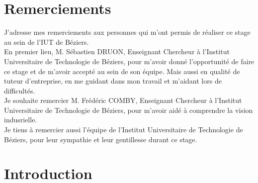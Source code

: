 \documentclass[12pt, french]{report}
\begin{document}
\section*{Remerciements}
J'adresse mes remerciements aux personnes qui m'ont permis de réaliser ce stage au sein de l'IUT de Béziers.\\

En premier lieu, M. Sébastien DRUON, Enseignant Chercheur à l'Institut Universitaire de Technologie de Béziers, pour m'avoir donné l'opportunité de faire ce stage et de m'avoir accepté au sein de son équipe. Mais aussi en qualité de tuteur d'entreprise, en me guidant dans mon travail et m'aidant lors de difficultés.\\

Je souhaite remercier M. Frédéric COMBY, Enseignant Chercheur à l'Institut Universitaire de Technologie de Béziers, pour m'avoir aidé à comprendre la vision indusrielle.\\

Je tiens à remercier aussi l'équipe de l'Institut Universitaire de Technologie de Béziers, pour leur sympathie et leur gentillesse durant ce stage.\\

\newpage

\renewcommand{\thepage}{}
\tableofcontents
\clearpage 


\startcontents[mainsections]%

\newpage
\renewcommand{\thepage}{\arabic{page}}
\setcounter{page}{1}

\section{Introduction}
\setcounter{page}{1} 
\end{document}
